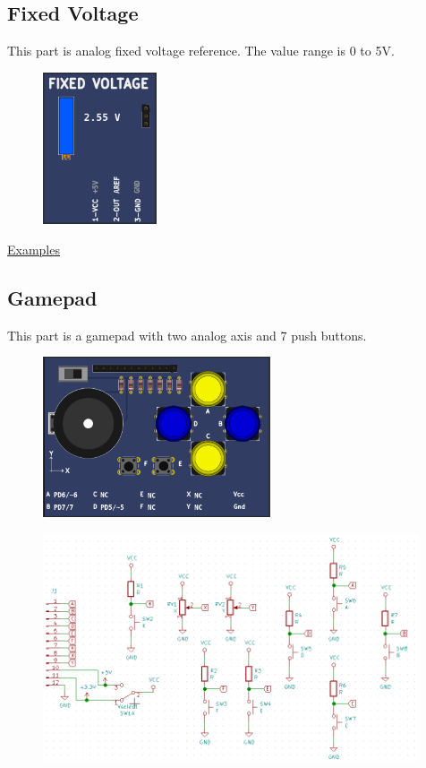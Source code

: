 \subsection{Fixed Voltage}

This part is analog fixed voltage reference. The value range is 0 to 5V.

\begin{figure}[H]
\center
\includegraphics[width=0.3\textwidth]{img/part_fixedv.png} 
\end{figure} 


\href{https://lcgamboa.github.io/picsimlab_examples/examples/examples_index.html\#Fixed_Voltage}{Examples}

 
\subsection{Gamepad}

This part is a gamepad with two analog axis and 7 push buttons.

\begin{figure}[H]
\center
\includegraphics[width=0.6\textwidth]{img/part_gamepad.png} 
\end{figure} 

\begin{figure}[H]
\center
\includegraphics[width=0.99\textwidth]{img/part_gamepad_.png} 
\end{figure} 

